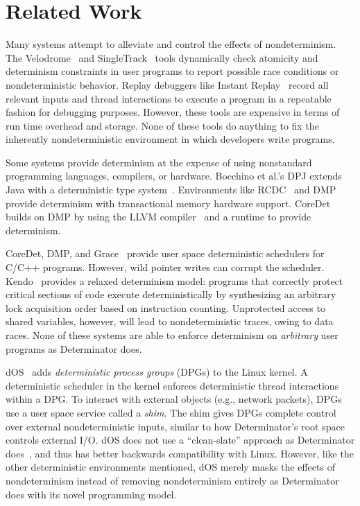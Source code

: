 
\section{Related Work}

Many systems attempt to alleviate and control the effects of nondeterminism.
The Velodrome~\cite{flanagan2008velodrome} and
SingleTrack~\cite{sadowski2009singletrack} tools dynamically check atomicity and
determinism constraints in user programs to report possible race conditions or
nondeterministic behavior. Replay debuggers like Instant
Replay~\cite{leblanc1987debugging} record all relevant inputs and thread
interactions to execute a program in a repeatable fashion for debugging
purposes. However, these tools are expensive in terms of run time overhead and
storage. None of these tools do anything to fix the inherently
nondeterministic environment in which developers write programs.

Some systems provide determinism at the expense of using nonstandard programming
languages, compilers, or hardware.
Bocchino et al.'s DPJ extends Java with a deterministic type
system~\cite{bocchino2009type}. Environments like RCDC~\cite{devietti2011rcdc}
and DMP~\cite{Devietti09} provide determinism with transactional memory hardware
support.
CoreDet~\cite{bergan2010coredet} builds on DMP by using the LLVM
compiler~\cite{lattner2004llvm} and a runtime to provide determinism.

CoreDet, DMP, and Grace~\cite{berger2009grace} provide user space deterministic
schedulers for C/C++ programs. However, wild pointer writes can corrupt the
scheduler. Kendo~\cite{olszewski2009kendo} provides a relaxed determinism model:
programs that correctly protect critical sections of code execute
deterministically by synthesizing an arbitrary lock acquisition order based on
instruction counting. Unprotected access to shared variables, however, will lead
to nondeterministic traces, owing to data races. None of these systems are able
to enforce determinism on \emph{arbitrary} user programs as Determinator does.

dOS~\cite{bergan2010deterministic} adds \emph{deterministic process groups}
(DPGs) to the Linux kernel. A deterministic scheduler in the kernel enforces
deterministic thread interactions within a DPG.
To interact with external objects (e.g., network packets), DPGs use a user
space service called a \emph{shim}. The shim gives DPGs complete control over
external nondeterministic inputs, similar to how Determinator's root space
controls external I/O. dOS does not use a ``clean-slate'' approach as
Determinator
does~\cite{Aviram10}, and thus has better backwards compatibility with Linux.
However, like the other deterministic environments mentioned, dOS merely masks
the effects of nondeterminism instead of removing nondeterminism entirely as
Determinator does with its novel programming model.

\endinput

